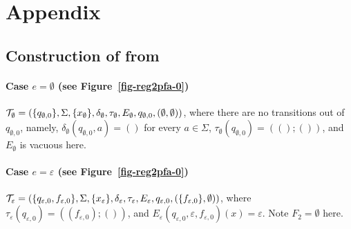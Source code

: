 
\section{Appendix}

\subsection{Construction of {\PSST} from {\regexp}} \label{app:reg2psst}

\paragraph{Case $e =\emptyset$ (see Figure~\ref{fig-reg2pfa-0})} $\mathcal{T}_\emptyset = (\{q_{\emptyset, 0}\}, \Sigma, \{x_{\emptyset}\}, \delta_\emptyset, \tau_\emptyset, E_\emptyset, q_{\emptyset, 0}, (\emptyset, \emptyset))$, where there are no transitions out of $q_{\emptyset,0}$, namely, $\delta_\emptyset(q_{\emptyset, 0}, a) = ()$ for every $a \in \Sigma$, $\tau_\emptyset(q_{\emptyset, 0}) = ((); ())$, and $E_\emptyset$ is vacuous here.


\paragraph{Case $e = \varepsilon$ (see Figure~\ref{fig-reg2pfa-0})} $\mathcal{T}_\varepsilon = (\{q_{\varepsilon, 0}, f_{\varepsilon,0}\}, \Sigma, \{x_\varepsilon\}, \delta_\varepsilon, \tau_\varepsilon, E_\varepsilon, q_{\varepsilon,0}, (\{f_{\varepsilon,0}\}, \emptyset))$, 
%
where 
$\tau_\varepsilon(q_{\varepsilon,0}) = ((f_{\varepsilon,0}); ())$, %
and $E_\varepsilon(q_{\varepsilon,0}, \varepsilon, f_{\varepsilon,0})(x) = \varepsilon$. Note $F_2 = \emptyset$ here. 

